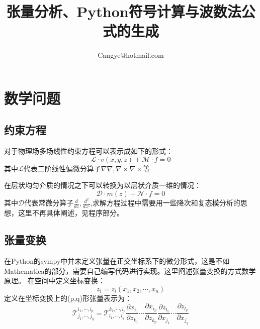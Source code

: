 \documentclass[UTF8]{article}
\author{Cangye@hotmail.com}
\title{张量分析、Python符号计算与波数法公式的生成}
\begin{document}
    \maketitle
    \section{数学问题}
        \subsection{约束方程}
            
对于物理场多场线性约束方程可以表示成如下的形式：
\begin{equation}
\mathcal{L}\cdot {v}(x,y,z)+\mathcal{M}\cdot {f}=0
\end{equation}
其中$\mathcal{L}$代表二阶线性偏微分算子$\nabla\nabla,\nabla\times\nabla\times$等

在层状均匀介质的情况之下可以转换为以层状介质一维的情况：
\begin{equation}
\mathcal{D} \cdot {m}(z)+\mathcal{N} \cdot {f}=0
\end{equation}
其中$\mathcal{D}$代表常微分算子$\frac{d}{dz},\frac{d^2}{dz^2}$,求解方程过程中需要用一些降次和复态模分析的思想，这里不再具体阐述，见程序部分。
        \subsection{张量变换}
在Python的sympy中并未定义张量在正交坐标系下的微分形式，这是不如Mathematica的部分，需要自己编写代码进行实现。这里阐述张量变换的方式数学原理。
在空间中定义坐标变换：
\begin{equation}
z_i=z_i(x_1,x_2,\cdots,x_n)
\end{equation}
定义在坐标变换上的(p,q)形张量表示为：
\begin{equation}
\mathcal{T}^{i_1,\cdots,i_p}_{j_1,\cdots,j_q}
=
\mathcal{T}^{k_1,\cdots,l_p}_{l_1,\cdots,l_q}
\frac{\partial x_{i_1}}{\partial z_{k_1}}
\cdots
\frac{\partial x_{i_p}}{\partial z_{k_p}}
\frac{\partial z_{l_1}}{\partial x_{j_1}}
\cdots
\frac{\partial z_{l_q}}{\partial x_{j_q}}
\end{equation}
\end{document}

